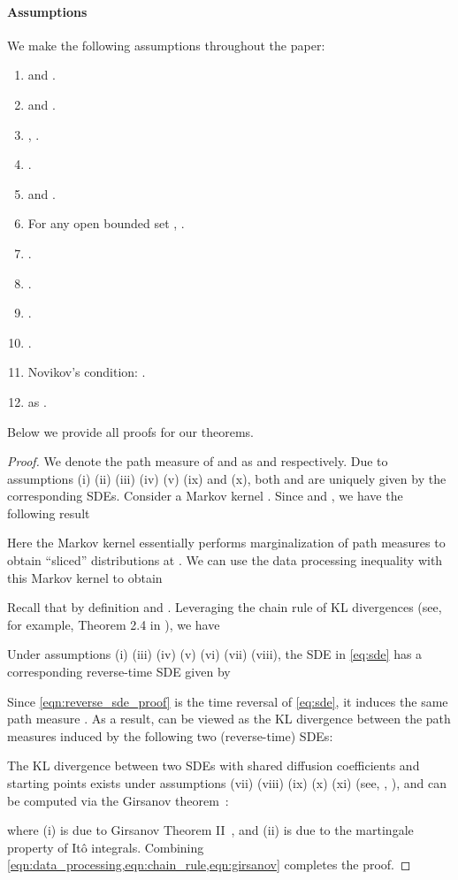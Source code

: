 \paragraph{Assumptions}
We make the following assumptions throughout the paper:
\begin{enumerate}[label=(\roman*)]
    \item  and .
    \item  and .
    \item , .
    \item .
    \item  and .
    \item For any open bounded set , .
    \item .
    \item .
    \item .
    \item .
    \item Novikov's condition: .
    \item  as .
\end{enumerate}
Below we provide all proofs for our theorems.
\bound*
\begin{proof}
We denote the path measure of  and  as  and  respectively. Due to assumptions (i) (ii) (iii) (iv) (v) (ix) and (x), both  and  are uniquely given by the corresponding SDEs. Consider a Markov kernel . Since  and , we have the following result

Here the Markov kernel  essentially performs marginalization of path measures to obtain ``sliced'' distributions at . We can use the data processing inequality with this Markov kernel to obtain

Recall that by definition  and . Leveraging the chain rule of KL divergences (see, for example, Theorem 2.4 in \cite{leonard2014some}), we have

Under assumptions (i) (iii) (iv) (v) (vi) (vii) (viii), the SDE in \cref{eq:sde} has a corresponding reverse-time SDE given by

Since \cref{eqn:reverse_sde_proof} is the time reversal of \cref{eq:sde}, it induces the same path measure . As a result,  can be viewed as the KL divergence between the path measures induced by the following two (reverse-time) SDEs:

The KL divergence between two SDEs with shared diffusion coefficients and starting points exists under assumptions (vii) (viii) (ix) (x) (xi) (see, \eg, \cite{tzen-NeuralStochasticDifferential-2019a,li-ScalableGradientsStochastic-2020}), and can be computed via the Girsanov theorem~\cite{oksendal2013stochastic}:

where (i) is due to Girsanov Theorem II~\cite[Theorem 8.6.6]{oksendal2013stochastic}, and (ii) is due to the martingale property of It\^{o} integrals.
Combining \cref{eqn:data_processing,eqn:chain_rule,eqn:girsanov} completes the proof.
\end{proof}

